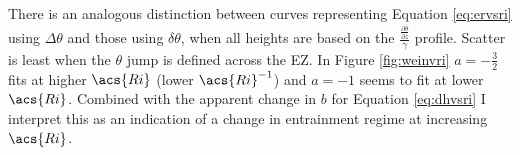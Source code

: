 There is an analogous distinction between curves representing Equation \ref{eq:ervsri} using $\Delta \theta$ and those using $\delta \theta$, when all heights are based on the $\frac{\frac{\partial \overline{\theta}}{\partial z}}{\gamma}$ profile.  Scatter is least when the $\theta$ jump is defined across the \acs{EZ}.  In Figure \ref{fig:weinvri} $a=-\frac{3}{2}$ fits at higher $\acs{Ri}$ (lower $\acs{Ri}^{-1}$) and $a=-1$ seems to fit at lower $\acs{Ri}$.  Combined with the apparent change in $b$ for Equation \ref{eq:dhvsri} I interpret this as an indication of a change in entrainment regime at increasing $\acs{Ri}$.\\ 

\FloatBarrier


\endinput

Any text after an \endinput is ignored.
You could put scraps here or things in progress.
